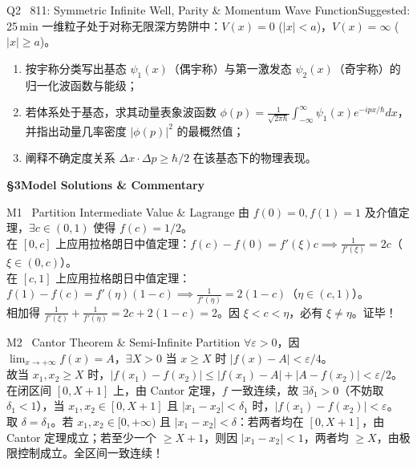 \documentclass[a4paper,11pt]{article}
\begin{document}
\vspace{3pt}

\begin{problem}{Q2 \textbar\ 811: Symmetric Infinite Well, Parity \& Momentum Wave Function}{Suggested: 25\,min}
一维粒子处于对称无限深方势阱中：$V(x) = 0$ ($|x| < a$)，$V(x) = \infty$ ($|x| \ge a$)。
\begin{enumerate}[leftmargin=1.5em,itemsep=1pt,topsep=1pt]
  \item 按宇称分类写出基态 $\psi_1(x)$（偶宇称）与第一激发态 $\psi_2(x)$（奇宇称）的归一化波函数与能级；
  \item 若体系处于基态，求其动量表象波函数 $\phi(p) = \frac{1}{\sqrt{2\pi\hbar}}\int_{-\infty}^\infty \psi_1(x) e^{-ipx/\hbar} dx$，并指出动量几率密度 $|\phi(p)|^2$ 的最概然值；
  \item 阐释不确定度关系 $\Delta x \cdot \Delta p \ge \hbar/2$ 在该基态下的物理表现。
\end{enumerate}
\end{problem}

\clearpage

{\Large\sffamily\bfseries\color{navy} \S 3\quad Model Solutions \& Commentary}

\vspace{4pt}

\begin{solution}{M1 \textperiodcentered\ Partition Intermediate Value \& Lagrange}
由 $f(0)=0, f(1)=1$ 及介值定理，$\exists c \in (0,1)$ 使得 $f(c) = 1/2$。\\
在 $[0,c]$ 上应用拉格朗日中值定理：$f(c)-f(0) = f'(\xi) c \implies \frac{1}{f'(\xi)} = 2c$（$\xi \in (0,c)$）。\\
在 $[c,1]$ 上应用拉格朗日中值定理：$f(1)-f(c) = f'(\eta) (1-c) \implies \frac{1}{f'(\eta)} = 2(1-c)$（$\eta \in (c,1)$）。\\
相加得 $\frac{1}{f'(\xi)} + \frac{1}{f'(\eta)} = 2c + 2(1-c) = 2$。因 $\xi < c < \eta$，必有 $\xi \neq \eta$。证毕！
\end{solution}

\vspace{3pt}

\begin{solution}{M2 \textperiodcentered\ Cantor Theorem \& Semi-Infinite Partition}
$\forall \varepsilon > 0$，因 $\lim_{x\to+\infty} f(x)=A$，$\exists X > 0$ 当 $x \ge X$ 时 $|f(x)-A| < \varepsilon/4$。\\
故当 $x_1, x_2 \ge X$ 时，$|f(x_1)-f(x_2)| \le |f(x_1)-A| + |A-f(x_2)| < \varepsilon/2$。\\
在闭区间 $[0, X+1]$ 上，由 Cantor 定理，$f$ 一致连续，故 $\exists \delta_1 > 0$（不妨取 $\delta_1 < 1$），当 $x_1, x_2 \in [0, X+1]$ 且 $|x_1-x_2|<\delta_1$ 时，$|f(x_1)-f(x_2)| < \varepsilon$。\\
取 $\delta = \delta_1$。若 $x_1, x_2 \in [0, +\infty)$ 且 $|x_1-x_2| < \delta$：若两者均在 $[0, X+1]$，由 Cantor 定理成立；若至少一个 $\ge X+1$，则因 $|x_1-x_2|<1$，两者均 $\ge X$，由极限控制成立。全区间一致连续！
\end{solution}
\end{document}
